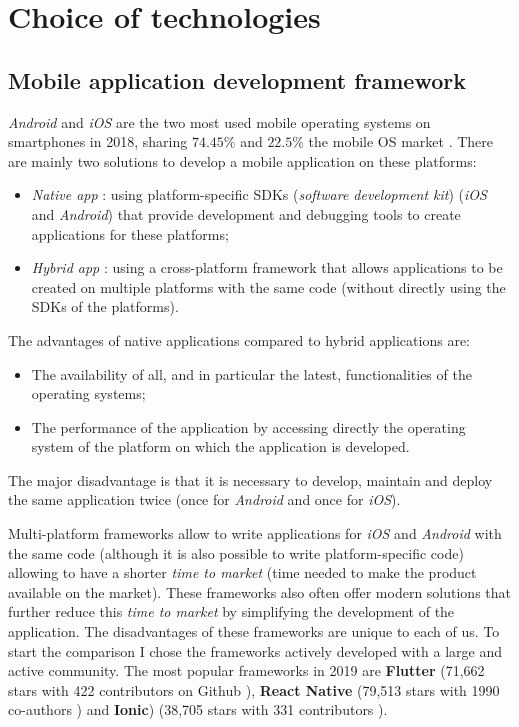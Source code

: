 \section{Choice of technologies}

\subsection{Mobile application development framework}

\textit{Android} and \textit{iOS} are the two most used mobile operating systems on smartphones in 2018, sharing  $74.45\%$ and $22.5\%$ the mobile OS market \cite{market_share}. There are mainly two solutions to develop a mobile application on these platforms:

\begin{itemize}
  \item \textit{Native app} : using platform-specific SDKs (\textit{software development kit}) (\textit{iOS} and \textit{Android}) that provide development and debugging tools to create applications for these platforms;
  \item \textit{Hybrid app} : using a cross-platform framework that allows applications to be created on multiple platforms with the same code (without directly using the SDKs of the platforms).
\end{itemize}

The advantages of native applications compared to hybrid applications are:

\begin{itemize}
  \item The availability of all, and in particular the latest, functionalities of the operating systems;
  \item The performance of the application by accessing directly the operating system of the platform on which the application is developed.
\end{itemize}

The major disadvantage is that it is necessary to develop, maintain and deploy the same application twice (once for \textit{Android} and once for \textit{iOS}).

Multi-platform frameworks allow to write applications for \textit{iOS} and \textit{Android} with the same code (although it is also possible to write platform-specific code) allowing to have a shorter \textit{time to market} (time needed to make the product available on the market). These frameworks also often offer modern solutions that further reduce this \textit{time to market} by simplifying the development of the application. The disadvantages of these frameworks are unique to each of us. To start the comparison I chose the frameworks actively developed with a large and active community. The most popular frameworks in 2019 are \textbf{Flutter} (71,662 stars with 422 contributors on Github \cite{flutter}), \textbf{React Native} (79,513 stars with 1990 co-authors \cite{react}) and \textbf{Ionic}) (38,705 stars with 331 contributors \cite{ionic}).


